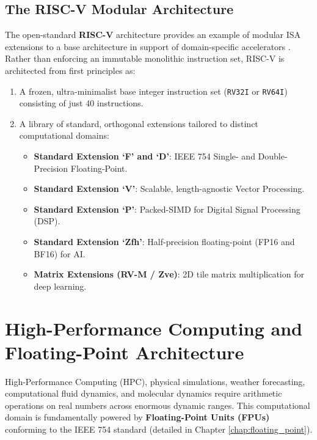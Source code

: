 \subsection{The RISC-V Modular Architecture}
The open-standard \textbf{RISC-V} architecture provides an example of modular ISA extensions to a base architecture in support of domain-specific accelerators \cite{asanovic2014instruction, riscv-spec}. Rather than enforcing an immutable monolithic instruction set, RISC-V is architected from first principles as:
\begin{enumerate}
    \item A frozen, ultra-minimalist base integer instruction set (\texttt{RV32I} or \texttt{RV64I}) consisting of just 40 instructions.
    \item A library of standard, orthogonal extensions tailored to distinct computational domains:
    \begin{itemize}
        \item \textbf{Standard Extension `F' and `D'}: IEEE 754 Single- and Double-Precision Floating-Point.
        \item \textbf{Standard Extension `V'}: Scalable, length-agnostic Vector Processing.
        \item \textbf{Standard Extension `P'}: Packed-SIMD for Digital Signal Processing (DSP).
        \item \textbf{Standard Extension `Zfh'}: Half-precision floating-point (FP16 and BF16) for AI.
        \item \textbf{Matrix Extensions (RV-M / Zve)}: 2D tile matrix multiplication for deep learning.
    \end{itemize}
\end{enumerate}

\section{High-Performance Computing and Floating-Point Architecture}\label{sec:hpc_floating_point}

High-Performance Computing (HPC), physical simulations, weather forecasting, computational fluid dynamics, and molecular dynamics require arithmetic operations on real numbers across enormous dynamic ranges. This computational domain is fundamentally powered by \textbf{Floating-Point Units (FPUs)} conforming to the IEEE 754 standard (detailed in Chapter \ref{chap:floating_point}).

